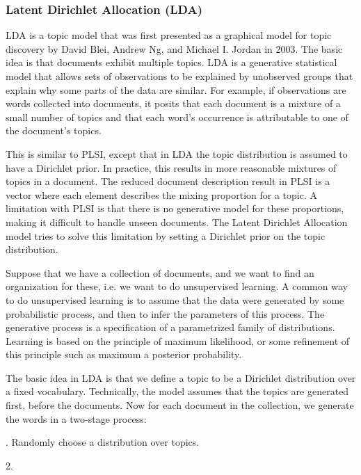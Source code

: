 \documentclass[12pt]{report}
\begin{document}
\subsubsection{Latent Dirichlet Allocation (LDA)}

LDA is a topic model that was first presented as a graphical model for topic
discovery by David Blei, Andrew Ng, and Michael I. Jordan in 2003. The basic
idea is that documents exhibit multiple topics. LDA is a generative statistical
model that allows sets of observations to be explained by unobserved groups
that explain why some parts of the data are similar. For example, if
observations are words collected into documents, it posits that each document
is a mixture of a small number of topics and that each word's occurrence is
attributable to one of the document's topics.\cite{Blei11introductionto}

This is similar to PLSI, except
that in LDA the topic distribution is assumed to have a Dirichlet prior. 
In practice, this results in more reasonable mixtures of topics in a
document. The reduced document description result in PLSI is a vector where
each element describes the mixing proportion for a topic. A limitation with
PLSI is that there is no generative model for these proportions, making it
difficult to handle unseen documents. The Latent Dirichlet Allocation model
tries to solve this limitation by setting a Dirichlet prior on the topic
distribution.\cite{blei2003latent}
 
Suppose that we have a collection of documents, and we want to find an
organization for these, i.e. we want to do unsupervised learning. A common way
to do unsupervised learning is to assume that the data were generated by some
probabilistic process, and then to infer the parameters of this process. The
generative process is a specification of a parametrized family of
distributions. Learning is based on the principle of maximum likelihood, or
some refinement of this principle such as maximum a posterior probability.
 
The basic idea in LDA is that we define a topic to be a Dirichlet distribution
over a fixed vocabulary. Technically, the model assumes that the topics are
generated first, before the documents.\cite{Blei11introductionto} Now for 
each document in the collection, we generate the words in a two-stage process:

\begin{algorithm}[H]
. Randomly choose a distribution over topics.

2. 
\end{algorithm}
\end{document}
